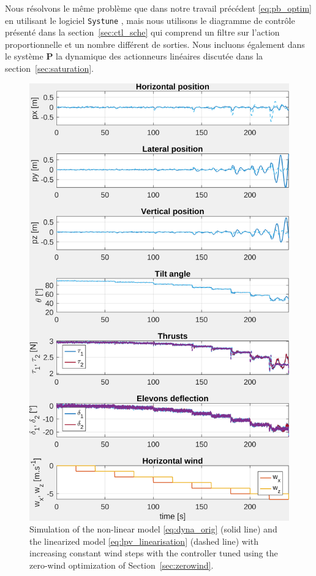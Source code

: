 Nous résolvons le même problème que dans notre travail précédent \ref{eq:pb_optim} en utilisant le logiciel {\tt Systune} \cite{1576856}, mais nous utilisons le diagramme de contrôle présenté dans la section~\ref{sec:ctl_sche} qui comprend un filtre sur l'action proportionnelle et un nombre différent de sorties. Nous incluons également dans le système $\boldsymbol{P}$ la dynamique des actionneurs linéaires discutée dans la section~\ref{sec:saturation}.
\begin{figure}[b!]
    \centering
    \includegraphics[trim=0cm 0cm 0cm 0cm,clip,width=0.9\columnwidth]{figures/sim_systune_zero_wind.png}
    \caption{Simulation of the non-linear model \eqref{eq:dyna_orig} (solid line) and the linearized model \eqref{eq:lpv_linearisation} (dashed line) with increasing constant wind steps with the controller tuned using the zero-wind optimization of Section~\ref{sec:zerowind}.}
    \label{fig:SimSytuneStruct_zero}
\end{figure}

